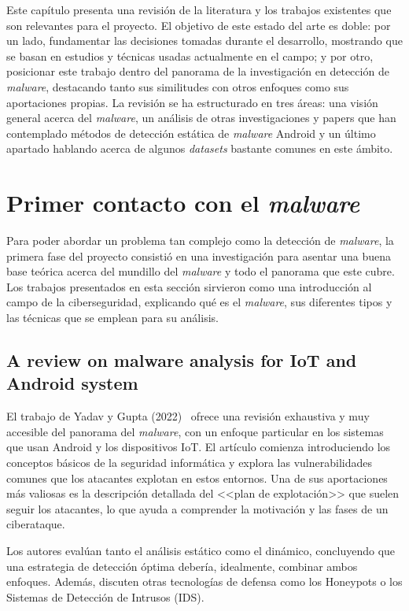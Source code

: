 
Este capítulo presenta una revisión de la literatura y los trabajos existentes que son relevantes para el proyecto. El objetivo de este estado del arte es doble: por un lado, fundamentar las decisiones tomadas durante el desarrollo, mostrando que se basan en estudios y técnicas usadas actualmente en el campo; y por otro, posicionar este trabajo dentro del panorama de la investigación en detección de \textit{malware}, destacando tanto sus similitudes con otros enfoques como sus aportaciones propias. La revisión se ha estructurado en tres áreas: una visión general acerca del \textit{malware}, un análisis de otras investigaciones y papers que han contemplado métodos de detección estática de \textit{malware} Android y un último apartado hablando acerca de algunos \textit{datasets} bastante comunes en este ámbito.

\section{Primer contacto con el \textit{malware}}

Para poder abordar un problema tan complejo como la detección de \textit{malware}, la primera fase del proyecto consistió en una investigación para asentar una buena base teórica acerca del mundillo del \textit{malware} y todo el panorama que este cubre. Los trabajos presentados en esta sección sirvieron como una introducción al campo de la ciberseguridad, explicando qué es el \textit{malware}, sus diferentes tipos y las técnicas que se emplean para su análisis.

\subsection{A review on malware analysis for IoT and Android system}

El trabajo de Yadav y Gupta (2022)~\cite{yadav2022review} ofrece una revisión exhaustiva y muy accesible del panorama del \textit{malware}, con un enfoque particular en los sistemas que usan Android y los dispositivos IoT. El artículo comienza introduciendo los conceptos básicos de la seguridad informática y explora las vulnerabilidades comunes que los atacantes explotan en estos entornos. Una de sus aportaciones más valiosas es la descripción detallada del <<plan de explotación>> que suelen seguir los atacantes, lo que ayuda a comprender la motivación y las fases de un ciberataque.

Los autores evalúan tanto el análisis estático como el dinámico, concluyendo que una estrategia de detección óptima debería, idealmente, combinar ambos enfoques. Además, discuten otras tecnologías de defensa como los Honeypots o los Sistemas de Detección de Intrusos (IDS).

